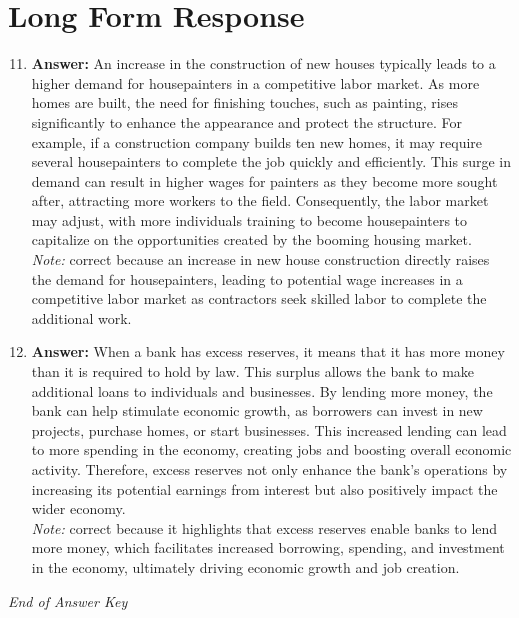 \documentclass[12pt]{article}
\begin{document}
\section*{Long Form Response}
\begin{enumerate}[label=\arabic*.]
\setcounter{enumi}{10}
\item \textbf{Answer:} An increase in the construction of new houses typically leads to a higher demand for housepainters in a competitive labor market. As more homes are built, the need for finishing touches, such as painting, rises significantly to enhance the appearance and protect the structure. For example, if a construction company builds ten new homes, it may require several housepainters to complete the job quickly and efficiently. This surge in demand can result in higher wages for painters as they become more sought after, attracting more workers to the field. Consequently, the labor market may adjust, with more individuals training to become housepainters to capitalize on the opportunities created by the booming housing market.
\\ \textit{Note:} correct because an increase in new house construction directly raises the demand for housepainters, leading to potential wage increases in a competitive labor market as contractors seek skilled labor to complete the additional work.
\item \textbf{Answer:} When a bank has excess reserves, it means that it has more money than it is required to hold by law. This surplus allows the bank to make additional loans to individuals and businesses. By lending more money, the bank can help stimulate economic growth, as borrowers can invest in new projects, purchase homes, or start businesses. This increased lending can lead to more spending in the economy, creating jobs and boosting overall economic activity. Therefore, excess reserves not only enhance the bank's operations by increasing its potential earnings from interest but also positively impact the wider economy.
\\ \textit{Note:} correct because it highlights that excess reserves enable banks to lend more money, which facilitates increased borrowing, spending, and investment in the economy, ultimately driving economic growth and job creation.
\end{enumerate}

\vfill
\noindent\textit{End of Answer Key}
\end{document}
